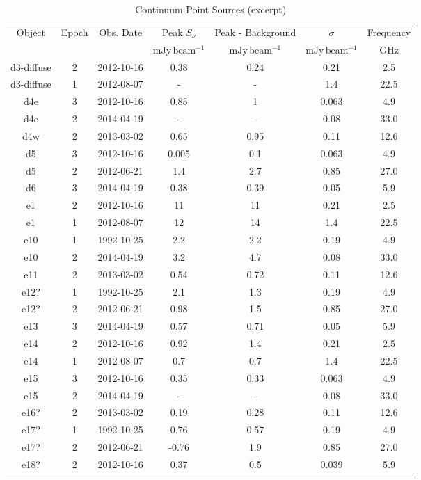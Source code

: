\begin{table*}[htp]
\caption{Continuum Point Sources (excerpt)}
\begin{tabular}{ccccccc}
\label{tab:contsrcs}
Object & Epoch & Obs. Date & Peak $S_{\nu}$ & Peak - Background & $\sigma$ & Frequency \\
 &  &  & $\mathrm{mJy\,beam^{-1}}$ & $\mathrm{mJy\,beam^{-1}}$ & $\mathrm{mJy\,beam^{-1}}$ & $\mathrm{GHz}$ \\
\hline
d3-diffuse & 2 & 2012-10-16 & 0.38 & 0.24 & 0.21 & 2.5 \\
d3-diffuse & 1 & 2012-08-07 & - & - & 1.4 & 22.5 \\
d4e & 3 & 2012-10-16 & 0.85 & 1 & 0.063 & 4.9 \\
d4e & 2 & 2014-04-19 & - & - & 0.08 & 33.0 \\
d4w & 2 & 2013-03-02 & 0.65 & 0.95 & 0.11 & 12.6 \\
d5 & 3 & 2012-10-16 & 0.005 & 0.1 & 0.063 & 4.9 \\
d5 & 2 & 2012-06-21 & 1.4 & 2.7 & 0.85 & 27.0 \\
d6 & 3 & 2014-04-19 & 0.38 & 0.39 & 0.05 & 5.9 \\
e1 & 2 & 2012-10-16 & 11 & 11 & 0.21 & 2.5 \\
e1 & 1 & 2012-08-07 & 12 & 14 & 1.4 & 22.5 \\
e10 & 1 & 1992-10-25 & 2.2 & 2.2 & 0.19 & 4.9 \\
e10 & 2 & 2014-04-19 & 3.2 & 4.7 & 0.08 & 33.0 \\
e11 & 2 & 2013-03-02 & 0.54 & 0.72 & 0.11 & 12.6 \\
e12? & 1 & 1992-10-25 & 2.1 & 1.3 & 0.19 & 4.9 \\
e12? & 2 & 2012-06-21 & 0.98 & 1.5 & 0.85 & 27.0 \\
e13 & 3 & 2014-04-19 & 0.57 & 0.71 & 0.05 & 5.9 \\
e14 & 2 & 2012-10-16 & 0.92 & 1.4 & 0.21 & 2.5 \\
e14 & 1 & 2012-08-07 & 0.7 & 0.7 & 1.4 & 22.5 \\
e15 & 3 & 2012-10-16 & 0.35 & 0.33 & 0.063 & 4.9 \\
e15 & 2 & 2014-04-19 & - & - & 0.08 & 33.0 \\
e16? & 2 & 2013-03-02 & 0.19 & 0.28 & 0.11 & 12.6 \\
e17? & 1 & 1992-10-25 & 0.76 & 0.57 & 0.19 & 4.9 \\
e17? & 2 & 2012-06-21 & -0.76 & 1.9 & 0.85 & 27.0 \\
e18? & 2 & 2012-10-16 & 0.37 & 0.5 & 0.039 & 5.9 \\

\end{tabular}
\end{table*}
